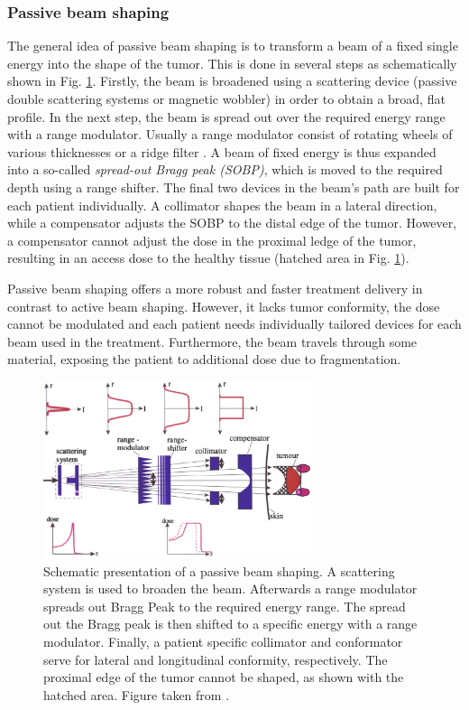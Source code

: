 \documentclass[type=dr, dr=rernat, accentcolor=tud7b,colorbacktitle, bigchapter, openright, twoside, 12pt ]{tudthesis}
\begin{document}
\subsubsection{Passive beam shaping}
\label{Sec::Passive}

The general idea of passive beam shaping is to transform a beam of a fixed single energy into the shape of the tumor. This is done in several steps as schematically shown in Fig. \ref{passive}. Firstly, the beam is broadened using a scattering device (passive double scattering systems or magnetic wobbler)
in order to obtain a broad, flat profile. In the next step, the beam is spread out over the required energy range with a range modulator. Usually a range modulator consist of rotating wheels of various thicknesses or a ridge filter \cite{Chu1993}. A beam of fixed energy is thus expanded into a so-called \textit{spread-out Bragg peak (SOBP)}, which is moved to the required depth using a range shifter. The final two devices in the beam's path are built for each patient individually. A collimator shapes the beam in a lateral direction, while a compensator adjusts the SOBP to the distal edge of the tumor. However, a compensator cannot adjust the dose in the proximal ledge of the tumor, resulting in an access dose to the healthy tissue (hatched area in Fig. \ref{passive}).
 
Passive beam shaping offers a more robust and faster treatment delivery in contrast to active beam shaping. However, it lacks tumor conformity, the dose cannot be modulated and each patient needs individually tailored devices for each beam used in the treatment.
 Furthermore, the beam travels through some material, exposing the patient to additional dose due to fragmentation.

 \newpage
 
\begin{figure}[H]
\begin{center}
\includegraphics[width=0.7\textwidth]{./Images/deliverypassive.png}
\caption{Schematic presentation of a passive beam shaping. A scattering system is used to broaden the beam. Afterwards a range modulator spreads out Bragg Peak to the required energy range.
The spread out the Bragg peak is then shifted to a specific energy with a range modulator. Finally, a patient specific collimator and conformator serve for lateral and longitudinal conformity, respectively.
The proximal edge of the tumor cannot be shaped, as shown with the hatched area. Figure taken from \cite{Schardt2010}.}
\label{passive}
\end{center}
\end{figure}
\end{document}

